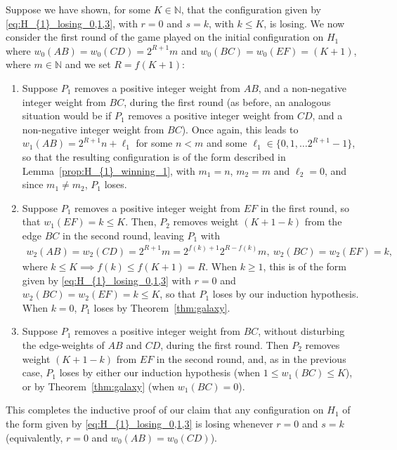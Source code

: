 \documentclass[11pt,reqno]{amsart}
\theoremstyle{definition}
\theoremstyle{definition}
\begin{document}
Suppose we have shown, for some $K \in \mathbb{N}$, that the configuration given by \eqref{eq:H_{1}_losing_0,1,3}, with $r=0$ and $s=k$, with $k \leqslant K$, is losing. We now consider the first round of the game played on the initial configuration on $H_{1}$ where $w_{0}(AB)=w_{0}(CD)=2^{R+1}m$ and $w_{0}(BC)=w_{0}(EF)=(K+1)$, where $m \in \mathbb{N}$ and we set $R=f(K+1)$:
\begin{enumerate}
\item Suppose $P_{1}$ removes a positive integer weight from $AB$, and a non-negative integer weight from $BC$, during the first round (as before, an analogous situation would be if $P_{1}$ removes a positive integer weight from $CD$, and a non-negative integer weight from $BC$). Once again, this leads to $w_{1}(AB)=2^{R+1}n+\ell_{1}$ for some $n < m$ and some $\ell_{1}\in \{0,1,\ldots2^{R+1}-1\}$, so that the resulting configuration is of the form described in Lemma~\ref{prop:H_{1}_winning_1}, with $m_{1}=n$, $m_{2}=m$ and $\ell_{2}=0$, and since $m_{1}\neq m_{2}$, $P_{1}$ loses.

\item Suppose $P_{1}$ removes a positive integer weight from $EF$ in the first round, so that $w_{1}(EF)=k\leqslant K$. Then, $P_{2}$ removes weight $(K+1-k)$ from the edge $BC$ in the second round, leaving $P_{1}$ with 
\begin{align}
w_{2}(AB)=w_{2}(CD)=2^{R+1}m=2^{f(k)+1}2^{R-f(k)}m,\ w_{2}(BC)=w_{2}(EF)=k,\nonumber
\end{align}
where $k \leqslant K\implies f(k)\leqslant f(K+1)=R$. When $k\geqslant 1$, this is of the form given by \eqref{eq:H_{1}_losing_0,1,3} with $r=0$ and $w_{2}(BC)=w_{2}(EF)=k \leqslant K$, so that $P_{1}$ loses by our induction hypothesis. When $k=0$, $P_{1}$ loses by Theorem~\ref{thm:galaxy}.

\item Suppose $P_{1}$ removes a positive integer weight from $BC$, without disturbing the edge-weights of $AB$ and $CD$, during the first round. Then $P_{2}$ removes weight $(K+1-k)$ from $EF$ in the second round, and, as in the previous case, $P_{1}$ loses by either our induction hypothesis (when $1 \leqslant w_{1}(BC)\leqslant K$), or by Theorem~\ref{thm:galaxy} (when $w_{1}(BC)=0$).
\end{enumerate}
This completes the inductive proof of our claim that any configuration on $H_{1}$ of the form given by \eqref{eq:H_{1}_losing_0,1,3} is losing whenever $r=0$ and $s=k$ (equivalently, $r=0$ and $w_{0}(AB)=w_{0}(CD)$).
\end{document}
